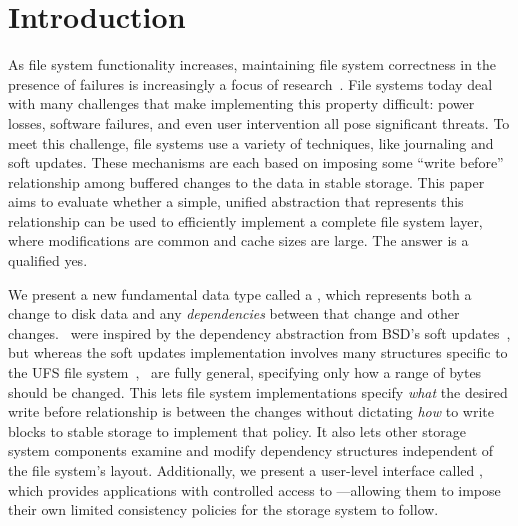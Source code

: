 
\section {Introduction}
\label{sec:intro}

\begin{comment}
This paper aims to evaluate whether a simple, unified abstraction that
represents all modifications to stable storage, including
\emph{dependencies} among modifications, can be used to efficiently
implement a complete file system layer, where modifications are common
and cache sizes are large.
%
The answer is a qualified yes.
\end{comment}


As file system functionality increases, maintaining file system
 correctness in the presence of failures is increasingly a focus of
 research~\cite{sivathanuetal05-logic,denehyetal05-journal-guided}.
%
File systems today deal with many challenges that make implementing this
 property difficult: power losses, software failures, and even user
 intervention all pose significant threats.
%
To meet this challenge, file systems use a variety of techniques, like
 journaling and soft updates.
%
These mechanisms are each based on imposing some ``write before''
 relationship among buffered changes to the data in stable storage.
%
This paper aims to evaluate whether a simple, unified abstraction that
 represents this relationship can be used to efficiently implement a
 complete file system layer, where modifications are common and cache
 sizes are large.
%
The answer is a qualified yes.


We present a new fundamental data type called a \emph{\patch},
 which represents both a change to disk data and any \emph{dependencies}
 between that change and other changes. 
%
\Patches\ were inspired by the dependency abstraction from BSD's soft
 updates~\cite{ganger00soft}, but whereas the soft updates implementation
 involves many structures specific to the UFS file
 system~\cite{mckusick99soft}, \patches\ are fully general,
 specifying only how a range of bytes should be changed.
%
This lets file system implementations specify \emph{what} the desired
 write before relationship is between the changes without dictating
 \emph{how} to write blocks to stable storage to implement that policy.
%
It also lets other storage system components examine and
 modify dependency structures independent of the file system's layout.
%
Additionally, we present a user-level interface called \patchgroups,
 which provides applications with controlled access to \patches---allowing
 them to impose their own limited consistency policies for the storage
 system to follow.


